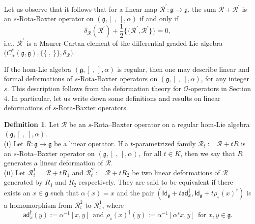 \documentclass[a4paper,11pt]{amsart}
\theoremstyle{plain}
\theoremstyle{definition}
\newtheorem{definition}[theorem]{Definition}
\theoremstyle{remark}
\numberwithin{equation}{section}
\begin{document}
Let us observe that it follows that for a linear map $\mathcal{R}^\prime:\mathfrak{g}\rightarrow \mathfrak{g}$, the sum $\mathcal{R}+\mathcal{R}^\prime$ is an $s$-Rota-Baxter operator on $(\mathfrak{g},[~,~],\alpha)$ if and only if 
$$\delta_\mathcal{R}(\mathcal{R}^{\prime})+\frac{1}{2}\{\!\!\{\mathcal{R}^\prime,\mathcal{R}^\prime\}\!\!\}=0,$$
i.e., $\mathcal{R}^\prime$ is a Maurer-Cartan element of the differential graded Lie algebra $\big(C^*_{\alpha}(\mathfrak{g},\mathfrak{g}),\{\!\!\{~,~\}\!\!\},\delta_\mathcal{R}\big)$.

If the hom-Lie algebra $(\mathfrak{g},[~,~],\alpha)$ is regular, then one may describe linear and formal deformations of $s$-Rota-Baxter operators on $(\mathfrak{g},[~,~],\alpha)$, for any integer $s$. This description follows from the deformation theory for $\mathcal{O}$-operators in Section $4$. In particular, let us write down some definitions and results on linear deformations of $s$-Rota-Baxter operators.

\begin{definition} Let $\mathcal{R}$ be an $s$-Rota–Baxter operator on a regular hom-Lie algebra $(\mathfrak{g}, [~,~], \alpha)$.\\
(i) Let $R: \mathfrak{g}\longrightarrow \mathfrak{g}$ be a linear operator. If a $t$-parametrized family $\mathcal{R}_t := \mathcal{R} + t R$ is an $s$-Rota–Baxter operator on $(\mathfrak{g}, [~,~], \alpha),$ for all $t \in K$, then we say that $R$ generates a linear deformation of $\mathcal{R}$.\\
(ii) Let $\mathcal{R}^1_t= \mathcal{R} + t R_1$ and $\mathcal{R}^2_t:= \mathcal{R} + t R_2$ be two linear deformations of $\mathcal{R}$ generated
by $R_1$ and $R_2$ respectively. They are said to be equivalent if there exists an $x \in \mathfrak{g}$
such that $\alpha(x)=x$ and the pair $(\mathsf{Id}_\mathfrak{g} + t \mathsf{ad}^\dagger_x , \mathsf{Id}_\mathfrak{g} + t\rho_s(x)^\dagger)$ is a homomorphism from $\mathcal{R}^2_t$ to $\mathcal{R}^1_t$, where $$\mathsf{ad}^{\dagger}_x(y):=\alpha^{-1}[x, y]~~ \mbox{and  }\rho_s(x)^{\dagger}(y):=\alpha^{-1}[\alpha^s x, y]~~\mbox{for } x, y\in \mathfrak{g}.$$ 
\end{definition}
\end{document}
